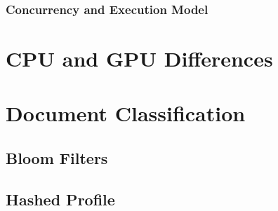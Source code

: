 \subsubsection{Concurrency and Execution Model}

\section{CPU and GPU Differences}

\section{Document Classification}

\subsection{Bloom Filters}

\subsection{Hashed Profile}

